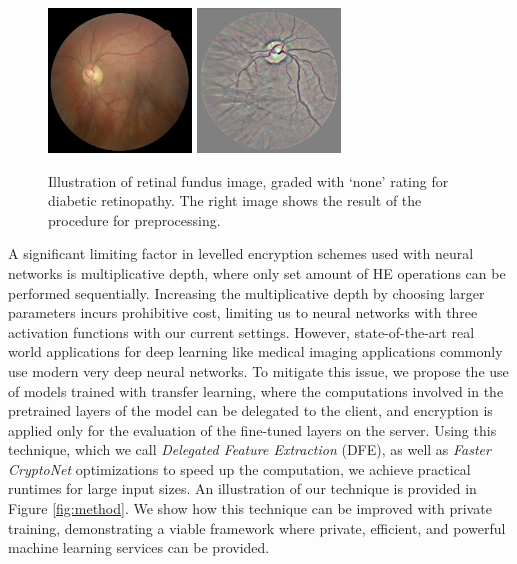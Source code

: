 \documentclass[conference]{IEEEtran}
\begin{document}
\begin{figure}[!htbp]
\centering
\includegraphics[width=1.5in]{figures/preprocess.png}
\includegraphics[width=1.5in]{figures/postprocess.png}
\caption{Illustration of retinal fundus image, graded with `none' rating for diabetic retinopathy. The right image shows the result of the procedure for preprocessing.}
\label{fig:data_example}
\end{figure}

A significant limiting factor in levelled encryption schemes used with neural networks is multiplicative depth, where only set amount of HE operations can be performed sequentially.  
Increasing the multiplicative depth by choosing larger parameters  incurs prohibitive cost, limiting us to neural networks with three activation functions with our current settings.
However, state-of-the-art real world applications for deep learning like medical imaging applications commonly use modern very deep neural networks. 
To mitigate this issue, we propose the use of models trained with transfer learning, where the computations involved in the pretrained layers of the model can be delegated to the client, and encryption is applied only for the evaluation of the fine-tuned layers on the server. 
Using this technique, which we call \textit{Delegated Feature Extraction} (DFE), as well as \textit{Faster CryptoNet} optimizations to speed up the computation, we achieve practical runtimes for large input sizes.  An illustration of our technique is provided in Figure \ref{fig:method}.
We show how this technique can be improved with private training, demonstrating a viable framework where private, efficient, and powerful machine learning services can be provided.

\end{document}
